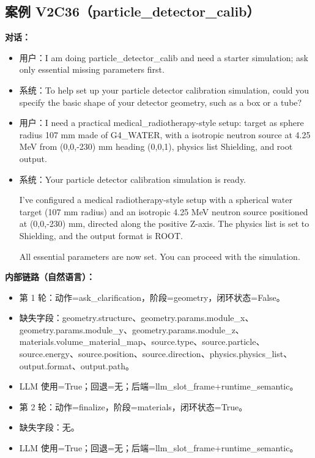 \documentclass[11pt]{ctexart}
\begin{document}
\subsection{案例 V2C36（particle\_detector\_calib）}
\textbf{对话：}
\begin{itemize}
\item 用户：I am doing particle\_detector\_calib and need a starter simulation; ask only essential missing parameters first.
\item 系统：To help set up your particle detector calibration simulation, could you specify the basic shape of your detector geometry, such as a box or a tube?
\item 用户：I need a practical medical\_radiotherapy-style setup: target as sphere radius 107 mm made of G4\_WATER, with a isotropic neutron source at 4.25 MeV from (0,0,-230) mm heading (0,0,1), physics list Shielding, and root output.
\item 系统：Your particle detector calibration simulation is ready.

I've configured a medical radiotherapy-style setup with a spherical water target (107 mm radius) and an isotropic 4.25 MeV neutron source positioned at (0,0,-230) mm, directed along the positive Z-axis. The physics list is set to Shielding, and the output format is ROOT.

All essential parameters are now set. You can proceed with the simulation.
\end{itemize}
\textbf{内部链路（自然语言）：}
\begin{itemize}
\item 第 1 轮：动作=ask\_clarification，阶段=geometry，闭环状态=False。
\item 缺失字段：geometry.structure、geometry.params.module\_x、geometry.params.module\_y、geometry.params.module\_z、materials.volume\_material\_map、source.type、source.particle、source.energy、source.position、source.direction、physics.physics\_list、output.format、output.path。
\item LLM 使用=True；回退=无；后端=llm\_slot\_frame+runtime\_semantic。
\item 第 2 轮：动作=finalize，阶段=materials，闭环状态=True。
\item 缺失字段：无。
\item LLM 使用=True；回退=无；后端=llm\_slot\_frame+runtime\_semantic。
\end{itemize}
\end{document}
